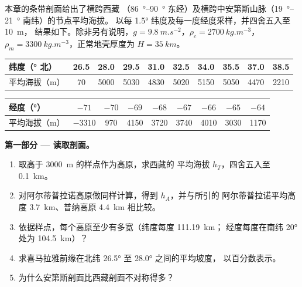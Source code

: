 \begin{problem}\label{pb:b2:himalaya-andes:1}
本章的条带剖面给出了横跨西藏
（\qtyrange{86}{90}{\degree} 东经）及横跨中安第斯山脉（\qtyrange{19}{21}{\degree} 南纬）的节点平均海拔。
以每 \ang{1.5} 纬度及每一度经度采样，并四舍五入至 \qty{10}{m}，
结果如下。除非另有说明，$g = \qty{9.8}{m.s^{-2}}$，$\rho_c = \qty{2700}{kg.m^{-3}}$，
$\rho_m = \qty{3300}{kg.m^{-3}}$，正常地壳厚度为 $H = \qty{35}{km}$。

\smallskip
\begin{center}\small
\begin{tabular}{l|ccccccccc}
纬度（\unit{\degree} 北） & 26.5 & 28.0 & 29.5 & 31.0 & 32.5 & 34.0 & 35.5 & 37.0 & 38.5 \\ \hline
平均海拔（\unit{m}） & 70 & 5000 & 5030 & 4830 & 5020 & 5150 & 5050 & 4470 & 2210
\end{tabular}

\smallskip
\begin{tabular}{l|cccccccc}
经度（\unit{\degree}） & $-71$ & $-70$ & $-69$ & $-68$ & $-67$ & $-66$ & $-65$ & $-64$ \\ \hline
平均海拔（\unit{m}） & $-3310$ & 970 & 4150 & 3720 & 3740 & 4010 & 3030 & 1170
\end{tabular}
\end{center}
\smallskip

\noindent\textbf{第一部分 --- 读取剖面。}
\begin{enumerate}
\item 取高于 \qty{3000}{m} 的样点作为高原，求西藏的
平均海拔 $h_T$，四舍五入至 \qty{0.1}{km}。
\item 对阿尔蒂普拉诺高原做同样计算，得到 $h_A$，并与所引的
阿尔蒂普拉诺平均高度 \qty{3.7}{km}、普纳高原 \qty{4.4}{km} 相比较。
\item 依据样点，每个高原至少有多宽（纬度每度 \qty{111.19}{km}；
经度每度在南纬 \ang{20} 处为 \qty{104.5}{km}）？
\item 求喜马拉雅前缘在北纬 \ang{26.5} 至 \ang{28.0} 之间的平均坡度，
以百分数表示。
\item 为什么安第斯剖面比西藏剖面不对称得多？
\end{enumerate}


\end{problem}
